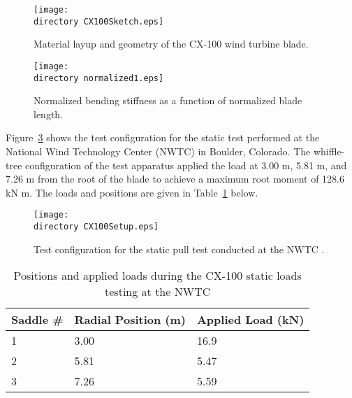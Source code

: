 \documentclass{aiaa-tc}
\def\directory{EPSF/}
\begin{document}
\begin{figure}
\centering
\texttt{[image: \\directory CX100Sketch.eps]}
\caption{Material layup and geometry of the CX-100 wind turbine blade\cite{paquette2006modeling}.} 
\label{CX100Sketch}
\end{figure}

\begin{figure}
\centering
\texttt{[image: \\directory normalized1.eps]}
\caption{Normalized bending stiffness as a function of normalized blade length.} 
\label{normalized1}
\end{figure}

Figure~\ref{CX100Setup} shows the test configuration for the static test performed at the National Wind Technology Center (NWTC) in Boulder, Colorado. The whiffle-tree configuration of the test apparatus applied the load at 3.00 m, 5.81 m, and 7.26 m from the root of the blade to achieve a maximum root moment of 128.6 kN m. The loads and positions are given in Table~\ref{CX100Load} below.


\begin{figure}
\centering
\texttt{[image: \\directory CX100Setup.eps]}
\caption{Test configuration for the static pull test conducted at the NWTC \cite{paquette2006modeling}.} 
\label{CX100Setup}
\end{figure}

\begin{table} 
\caption{\label{CX100Load}Positions and applied loads during the CX-100 static loads testing at the NWTC  } 
\begin{center}
    \begin{tabular}{| l | l |l |}
    	\hline
    	 Saddle \# &     Radial Position (m) & Applied Load (kN)  \\ \hline
    1&	3.00 & 16.9         \\  \hline
    2&	5.81   & 5.47         \\ \hline
    3&	    	7.26   & 5.59         \\ \hline
    \end{tabular}
\end{center}
\end{table}
\end{document}
